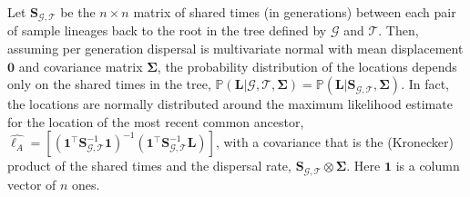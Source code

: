 \documentclass[12pt]{article}
\begin{document}
Let $\mathbf{S}_{\mathcal{G},\mathcal{T}}$ be the $n\times n$ matrix of shared  times (in generations) between each pair of sample lineages back to the root in the tree defined by $\mathcal{G}$ and $\mathcal{T}$. Then, assuming per generation dispersal is multivariate normal with mean displacement $\mathbf{0}$ and covariance matrix $\mathbf{\Sigma}$, the probability distribution of the locations depends only on the shared times in the tree, $\mathbb{P}(\mathbf{L} | \mathcal{G},\mathcal{T}, \mathbf{\Sigma}) = \mathbb{P}(\mathbf{L} | \mathbf{S}_{\mathcal{G},\mathcal{T}}, \mathbf{\Sigma})$.
%
In fact, the locations are normally distributed
%
%
around the maximum likelihood estimate for the location of the most recent common ancestor,
% 
$\widehat{\bm{\ell}_A} = [(\mathbf{1}^\intercal \mathbf{S}_{\mathcal{G},\mathcal{T}}^{-1} \mathbf{1})^{-1}(\mathbf{1}^\intercal \mathbf{S}_{\mathcal{G},\mathcal{T}}^{-1} \mathbf{L})]$,
%
with a covariance that is the (Kronecker) product of the shared times and the dispersal rate, $\mathbf{S}_{\mathcal{G},\mathcal{T}} \otimes \mathbf{\Sigma}$.
Here $\mathbf{1}$ is a column vector of $n$ ones. %
\end{document}
